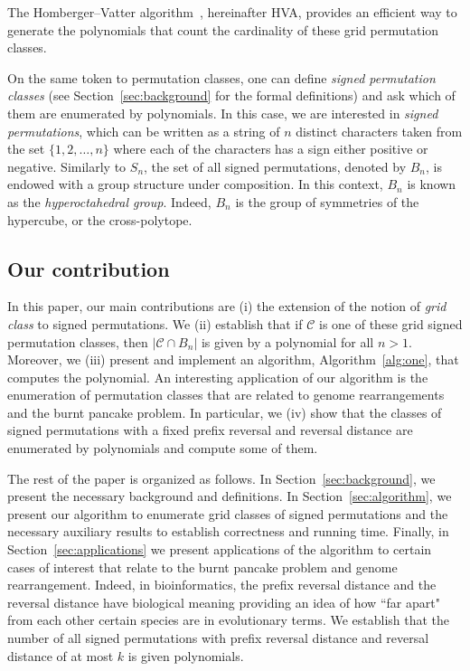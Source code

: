 \documentclass{article}
\numberwithin{equation}{section}
\theoremstyle{definition}
\begin{document}
The Homberger--Vatter algorithm~\cite{HV16}, hereinafter HVA, provides an efficient way to generate the polynomials that count the cardinality of these grid permutation classes. 

On the same token to permutation classes, one can define \emph{signed permutation classes} (see Section~\ref{sec:background} for the formal definitions) and ask which of them are enumerated by polynomials. In this case, we are interested in \emph{signed permutations}, which can be written as a string of $n$ distinct characters taken from the set $\{1,2,\ldots, n\}$ where each of the characters has a sign either positive or negative. Similarly to $S_n$, the set of all signed permutations, denoted by $B_n$, is endowed with a group structure under composition. In this context, $B_n$ is known as the \emph{hyperoctahedral group}. Indeed, $B_n$ is the group of symmetries of the hypercube, or the cross-polytope. 




\subsection{Our contribution} 

In this paper, our main contributions are (i) the extension of the notion of \emph{grid class} to signed permutations. We (ii) establish that if $\mathcal{C}$ is one of these grid signed permutation classes, then $|\mathcal{C}\cap B_n|$ is given by a polynomial for all $n>1$. Moreover, we (iii) present and implement an algorithm, Algorithm~\ref{alg:one}, that computes the polynomial. An interesting application of our algorithm is the enumeration of permutation classes that are related to genome rearrangements and the burnt pancake problem. In particular, we (iv) show that the classes of signed permutations with a fixed prefix reversal and reversal distance are enumerated by polynomials and compute some of them.

The rest of the paper is organized as follows. In Section~\ref{sec:background}, we present the necessary background and definitions. In Section~\ref{sec:algorithm}, we present our algorithm to enumerate grid classes of signed permutations and the necessary auxiliary results to establish correctness and running time. Finally, in Section~\ref{sec:applications} we present applications of the algorithm to certain cases of interest that relate to the burnt pancake problem and genome rearrangement. Indeed, in bioinformatics, the prefix reversal distance and the reversal distance have biological meaning providing an idea of how ``far apart" from each other certain species are in evolutionary terms. We establish that the number of all signed permutations with prefix reversal distance and reversal distance of at most $k$ is given polynomials. 
\end{document}
